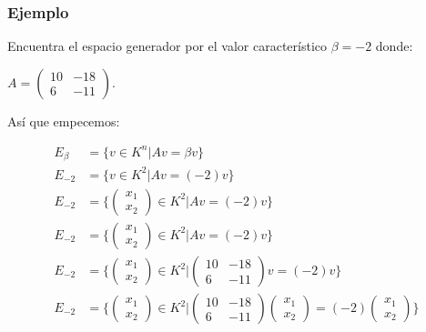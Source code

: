 \documentclass[12pt]{report}                                    %
\begin{document}
            \clearpage
            \subsubsection{Ejemplo}
            Encuentra el espacio generador por el valor característico 
            $\beta = -2$ donde:

            $A = \begin{pmatrix}10&-18\\6&-11\end{pmatrix}$.

            Así que empecemos:

            \begin{equation*}
            \begin{split}
                E_{\beta} &= \{v \in K^n | Av = \beta v \}  \\
                E_{-2} &= \{v \in K^2 | Av = (-2) v \} \\
                E_{-2} &= \{ \begin{pmatrix}x_1\\x_2\end{pmatrix} \in K^2 | Av = (-2) v \} \\
                E_{-2} &= \{ \begin{pmatrix}x_1\\x_2\end{pmatrix} \in K^2 | Av = (-2) v \} \\
                E_{-2} &= \{ \begin{pmatrix}x_1\\x_2\end{pmatrix} \in K^2 |
                \begin{pmatrix}10&-18\\6&-11\end{pmatrix}v = (-2) v \} \\
                E_{-2} &= \{ \begin{pmatrix}x_1\\x_2\end{pmatrix} \in K^2 |
                \begin{pmatrix}10&-18\\6&-11\end{pmatrix}  \begin{pmatrix}x_1\\x_2\end{pmatrix} 
                = (-2) \begin{pmatrix}x_1\\x_2\end{pmatrix} \} \\

\end{split}
\end{equation*}
\end{document}
